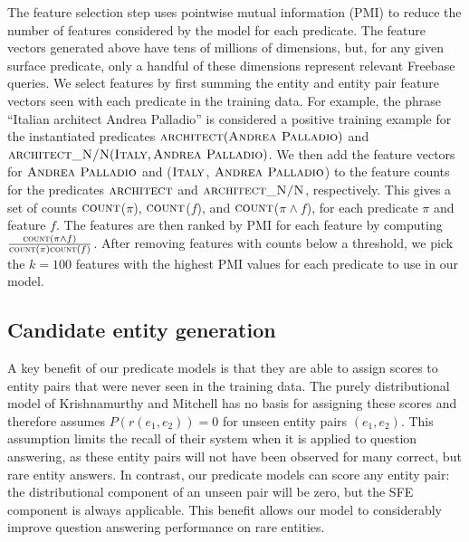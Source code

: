 \documentclass[11pt]{article}
\newcommand{\formalpredicate}[1]{\ensuremath{\textsc{#1}}}
\newcommand{\entity}[1]{\ensuremath{\textsc{#1}}}
\begin{document}
The feature selection step uses pointwise mutual information (PMI) to reduce
the number of features considered by the model for each predicate. The feature
vectors generated above have tens of millions of dimensions, but, for any given
surface predicate, only a handful of these dimensions represent relevant
Freebase queries. We select features by first summing the entity and entity
pair feature vectors seen with each predicate in the training data. For
example, the phrase ``Italian architect Andrea Palladio'' is considered a
positive training example for the instantiated predicates
$\formalpredicate{architect}(\entity{Andrea Palladio})$ and
$\formalpredicate{architect\_N/N}(\entity{Italy}, \entity{Andrea Palladio})$.
We then add the feature vectors for \entity{Andrea Palladio} and
(\entity{Italy}, \entity{Andrea Palladio}) to the feature counts for the
predicates \formalpredicate{architect} and \formalpredicate{architect\_N/N},
respectively. This gives a set of counts \formalpredicate{count}($\pi$),
\formalpredicate{count}($f$), and \formalpredicate{count}($\pi\land f$), for
each predicate $\pi$ and feature $f$.  The features are then ranked by PMI for
each feature by computing $\frac{\formalpredicate{count}(\pi\land
f)}{\formalpredicate{count}(\pi)\formalpredicate{count}(f)}$.  After removing
features with counts below a threshold, we pick the $k=100$ features with the
highest PMI values for each predicate to use in our model.

\subsection{Candidate entity generation}
\label{sec:better-candidates}

A key benefit of our predicate models is that they are able to assign scores to
entity pairs that were never seen in the training data. The purely
distributional model of Krishnamurthy and Mitchell has no basis for assigning
these scores and therefore assumes $P(r(e_1,e_2)) = 0$ for unseen entity pairs
$(e_1,e_2)$. This assumption limits the recall of their system when it is
applied to question answering, as these entity pairs will not have been
observed for many correct, but rare entity answers. In contrast, our predicate
models can score any entity pair: the distributional component of an unseen
pair will be zero, but the SFE component is always applicable. This benefit
allows our model to considerably improve question answering performance on rare
entities.
\end{document}
